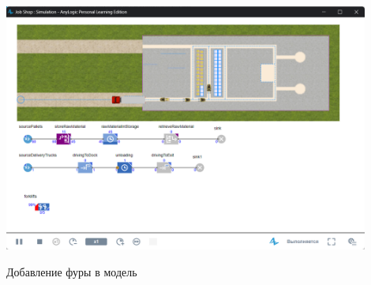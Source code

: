 \begin{image}
	\includegraphics[width=0.9\textwidth]{2023-04-02_15-46-36}
	\caption{Добавление фуры в модель}
	\label{fig:model:truck}
\end{image}

